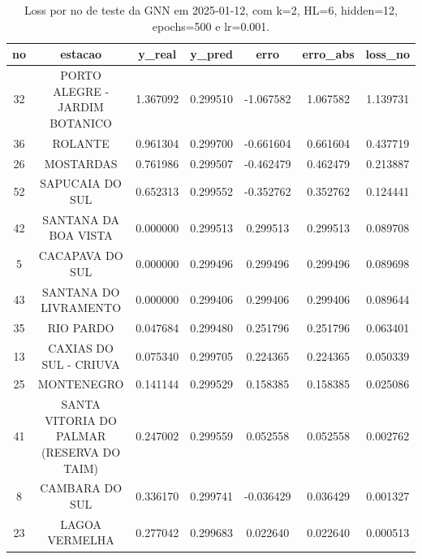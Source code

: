 \begin{table}[h]
\centering
\caption{Loss por no de teste da GNN em 2025-01-12, com k=2, HL=6, hidden=12, epochs=500 e lr=0.001.}
\label{tab:gnn_loss_k2_hl6_h12_e500_d20250112}
\begin{tabular}{ccccccc}
\toprule
no & estacao & y\_real & y\_pred & erro & erro\_abs & loss\_no \\
\midrule
32 & PORTO ALEGRE - JARDIM BOTANICO & 1.367092 & 0.299510 & -1.067582 & 1.067582 & 1.139731 \\
36 & ROLANTE & 0.961304 & 0.299700 & -0.661604 & 0.661604 & 0.437719 \\
26 & MOSTARDAS & 0.761986 & 0.299507 & -0.462479 & 0.462479 & 0.213887 \\
52 & SAPUCAIA DO SUL & 0.652313 & 0.299552 & -0.352762 & 0.352762 & 0.124441 \\
42 & SANTANA DA BOA VISTA & 0.000000 & 0.299513 & 0.299513 & 0.299513 & 0.089708 \\
5 & CACAPAVA DO SUL & 0.000000 & 0.299496 & 0.299496 & 0.299496 & 0.089698 \\
43 & SANTANA DO LIVRAMENTO & 0.000000 & 0.299406 & 0.299406 & 0.299406 & 0.089644 \\
35 & RIO PARDO & 0.047684 & 0.299480 & 0.251796 & 0.251796 & 0.063401 \\
13 & CAXIAS DO SUL - CRIUVA & 0.075340 & 0.299705 & 0.224365 & 0.224365 & 0.050339 \\
25 & MONTENEGRO & 0.141144 & 0.299529 & 0.158385 & 0.158385 & 0.025086 \\
41 & SANTA VITORIA DO PALMAR (RESERVA DO TAIM) & 0.247002 & 0.299559 & 0.052558 & 0.052558 & 0.002762 \\
8 & CAMBARA DO SUL & 0.336170 & 0.299741 & -0.036429 & 0.036429 & 0.001327 \\
23 & LAGOA VERMELHA & 0.277042 & 0.299683 & 0.022640 & 0.022640 & 0.000513 \\
\bottomrule
\end{tabular}
\end{table}
